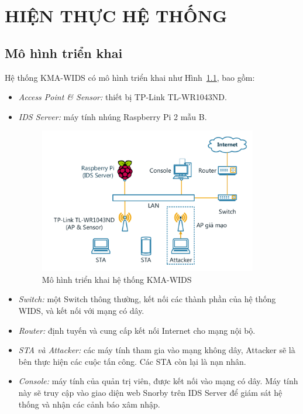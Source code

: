 \chapter{HIỆN THỰC HỆ THỐNG}
\ifpdf
    \graphicspath{{Chapter4/Chapter4Figs/PNG/}{Chapter4/Chapter4Figs/PDF/}{Chapter4/Chapter4Figs/}}
\else
    \graphicspath{{Chapter4/Chapter4Figs/EPS/}{Chapter4/Chapter4Figs/}}
\fi

\section{Mô hình triển khai}
Hệ thống KMA-WIDS có mô hình triển khai như Hình~\ref{fig:diagram-wids-new-demo}, bao gồm:

\begin{itemize}
\item \emph{Access Point \& Sensor:} thiết bị TP-Link TL-WR1043ND.
\item \emph{IDS Server:}  máy tính nhúng Raspberry Pi 2 mẫu B.

\begin{figure}[!htbp]
    \centering
    \includegraphics[width=0.9\textwidth]{diagram-wids-new-demo}
    \caption{
        \label{fig:diagram-wids-new-demo}
        Mô hình triển khai hệ thống KMA-WIDS}
\end{figure}

\item \emph{Switch:} một Switch thông thường, kết nối các thành phần của hệ thống WIDS, và kết nối với mạng có dây.
\item \emph{Router:} định tuyến và cung cấp kết nối Internet cho mạng nội bộ.
\item \emph{STA và Attacker:} các máy tính tham gia vào mạng không dây, Attacker sẽ là bên thực hiện các cuộc tấn công. Các STA còn lại là nạn nhân.
\item \emph{Console:} máy tính của quản trị viên, được kết nối vào mạng có dây. Máy tính này sẽ truy cập vào giao diện web Snorby trên IDS Server để giám sát hệ thống và nhận các cảnh báo xâm nhập.
\end{itemize}

